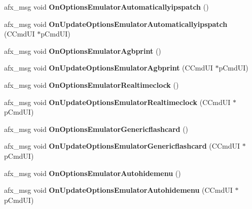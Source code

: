 \begin{DoxyCompactItemize}
\item 
\mbox{\label{class_main_wnd_a346906f834cf5c654550dafab20e864c}} 
afx\+\_\+msg void {\bfseries On\+Options\+Emulator\+Automaticallyipspatch} ()
\item 
\mbox{\label{class_main_wnd_ae5a5c5ae891dd3cd876325b59a50465b}} 
afx\+\_\+msg void {\bfseries On\+Update\+Options\+Emulator\+Automaticallyipspatch} (C\+Cmd\+UI $\ast$p\+Cmd\+UI)
\item 
\mbox{\label{class_main_wnd_ac4ff3f77ecc063505ba2565d5f54277b}} 
afx\+\_\+msg void {\bfseries On\+Options\+Emulator\+Agbprint} ()
\item 
\mbox{\label{class_main_wnd_aad1f7f9bff514babc68d81e52bdfdd92}} 
afx\+\_\+msg void {\bfseries On\+Update\+Options\+Emulator\+Agbprint} (C\+Cmd\+UI $\ast$p\+Cmd\+UI)
\item 
\mbox{\label{class_main_wnd_a53770e7d481b904a0a3993d7c2e1dedb}} 
afx\+\_\+msg void {\bfseries On\+Options\+Emulator\+Realtimeclock} ()
\item 
\mbox{\label{class_main_wnd_a0db3f50e5b656ca0d67ddfeccfbd4dba}} 
afx\+\_\+msg void {\bfseries On\+Update\+Options\+Emulator\+Realtimeclock} (C\+Cmd\+UI $\ast$p\+Cmd\+UI)
\item 
\mbox{\label{class_main_wnd_a39017815a0e680f2e6db60c49bae967e}} 
afx\+\_\+msg void {\bfseries On\+Options\+Emulator\+Genericflashcard} ()
\item 
\mbox{\label{class_main_wnd_a4f2fe44c9b633dd600d93fbb0b0e3840}} 
afx\+\_\+msg void {\bfseries On\+Update\+Options\+Emulator\+Genericflashcard} (C\+Cmd\+UI $\ast$p\+Cmd\+UI)
\item 
\mbox{\label{class_main_wnd_aad0ef218c2640f431c99fa522c2b3518}} 
afx\+\_\+msg void {\bfseries On\+Options\+Emulator\+Autohidemenu} ()
\item 
\mbox{\label{class_main_wnd_ad3cade08132d08c4db013a0d240cc729}} 
afx\+\_\+msg void {\bfseries On\+Update\+Options\+Emulator\+Autohidemenu} (C\+Cmd\+UI $\ast$p\+Cmd\+UI)

\end{DoxyCompactItemize}
